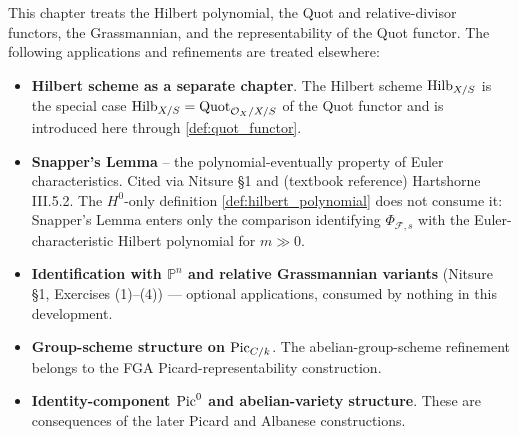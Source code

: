 This chapter treats the Hilbert polynomial, the Quot and relative-divisor
functors, the Grassmannian, and the representability of the Quot functor.
The following applications and refinements are treated elsewhere:
\begin{itemize}
  \item \textbf{Hilbert scheme as a separate chapter}. The Hilbert scheme
    \(\operatorname{Hilb}_{X/S}\) is the special case
    \(\operatorname{Hilb}_{X/S} = \operatorname{Quot}_{\mathcal{O}_X/X/S}\) of the Quot functor and is
    introduced here through \cref{def:quot_functor}.
  \item \textbf{Snapper's Lemma} -- the polynomial-eventually property of
    Euler characteristics. Cited via Nitsure \S 1 and (textbook reference)
    Hartshorne III.5.2. The \(H^0\)-only definition
    \cref{def:hilbert_polynomial} does not consume it: Snapper's Lemma enters
    only the comparison identifying
    \(\Phi_{\mathcal{F},s}\) with the Euler-characteristic Hilbert polynomial
    for \(m \gg 0\).
  \item \textbf{Identification with \(\mathbb{P}^n\) and relative
    Grassmannian variants} (Nitsure \S 1, Exercises (1)--(4)) --- optional
    applications, consumed by nothing in this development.
  \item \textbf{Group-scheme structure on \(\operatorname{Pic}_{C/k}\)}. The
    abelian-group-scheme refinement belongs to the FGA
    Picard-representability construction.
  \item \textbf{Identity-component \(\operatorname{Pic}^0\) and abelian-variety
    structure}. These are consequences of the later Picard and Albanese
    constructions.
\end{itemize}
